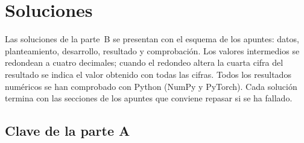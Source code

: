 \chapter{Soluciones}
\label{ap:soluciones}

Las soluciones de la parte~B se presentan con el esquema de los apuntes: datos, planteamiento, desarrollo, resultado y comprobación. Los valores intermedios se redondean a cuatro decimales; cuando el redondeo altera la cuarta cifra del resultado se indica el valor obtenido con todas las cifras. Todos los resultados numéricos se han comprobado con Python (NumPy y PyTorch). Cada solución termina con las secciones de los apuntes que conviene repasar si se ha fallado.

\section{Clave de la parte A}
\label{sec:clave}

